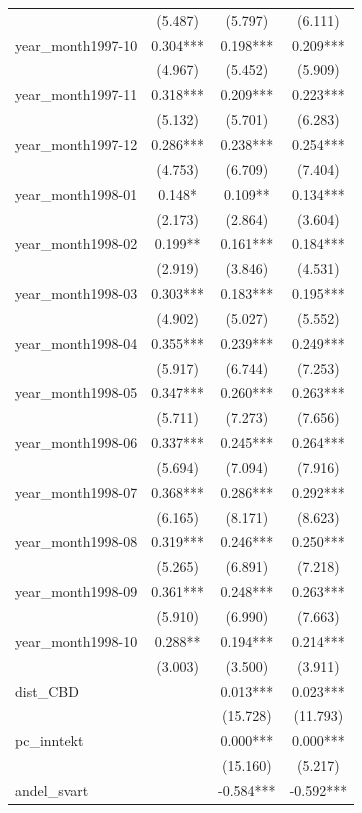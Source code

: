 \documentclass[
  norsk,
  a4paper,
]{article}
\begin{document}
\begin{table}
\begin{tabular*}{\linewidth}{@{\extracolsep{\fill}}lccc}
 & (5.487) & (5.797) & (6.111) \\ 
year\_month1997-10 & 0.304*** & 0.198*** & 0.209*** \\ 
 & (4.967) & (5.452) & (5.909) \\ 
year\_month1997-11 & 0.318*** & 0.209*** & 0.223*** \\ 
 & (5.132) & (5.701) & (6.283) \\ 
year\_month1997-12 & 0.286*** & 0.238*** & 0.254*** \\ 
 & (4.753) & (6.709) & (7.404) \\ 
year\_month1998-01 & 0.148* & 0.109** & 0.134*** \\ 
 & (2.173) & (2.864) & (3.604) \\ 
year\_month1998-02 & 0.199** & 0.161*** & 0.184*** \\ 
 & (2.919) & (3.846) & (4.531) \\ 
year\_month1998-03 & 0.303*** & 0.183*** & 0.195*** \\ 
 & (4.902) & (5.027) & (5.552) \\ 
year\_month1998-04 & 0.355*** & 0.239*** & 0.249*** \\ 
 & (5.917) & (6.744) & (7.253) \\ 
year\_month1998-05 & 0.347*** & 0.260*** & 0.263*** \\ 
 & (5.711) & (7.273) & (7.656) \\ 
year\_month1998-06 & 0.337*** & 0.245*** & 0.264*** \\ 
 & (5.694) & (7.094) & (7.916) \\ 
year\_month1998-07 & 0.368*** & 0.286*** & 0.292*** \\ 
 & (6.165) & (8.171) & (8.623) \\ 
year\_month1998-08 & 0.319*** & 0.246*** & 0.250*** \\ 
 & (5.265) & (6.891) & (7.218) \\ 
year\_month1998-09 & 0.361*** & 0.248*** & 0.263*** \\ 
 & (5.910) & (6.990) & (7.663) \\ 
year\_month1998-10 & 0.288** & 0.194*** & 0.214*** \\ 
 & (3.003) & (3.500) & (3.911) \\ 
dist\_CBD &  & 0.013*** & 0.023*** \\ 
 &  & (15.728) & (11.793) \\ 
pc\_inntekt &  & 0.000*** & 0.000*** \\ 
 &  & (15.160) & (5.217) \\ 
andel\_svart &  & -0.584*** & -0.592*** \\ 

\end{tabular*}
\end{table}
\end{document}
